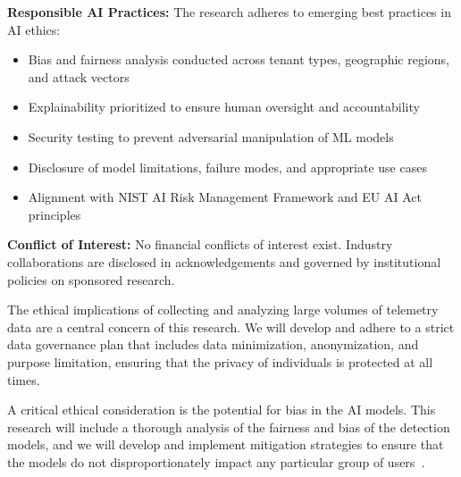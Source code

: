\textbf{Responsible AI Practices:} The research adheres to emerging best practices in AI ethics:
\begin{itemize}
    \item Bias and fairness analysis conducted across tenant types, geographic regions, and attack vectors
    \item Explainability prioritized to ensure human oversight and accountability
    \item Security testing to prevent adversarial manipulation of ML models
    \item Disclosure of model limitations, failure modes, and appropriate use cases
    \item Alignment with NIST AI Risk Management Framework and EU AI Act principles
\end{itemize}

\textbf{Conflict of Interest:} No financial conflicts of interest exist. Industry collaborations are disclosed in acknowledgements and governed by institutional policies on sponsored research.

The ethical implications of collecting and analyzing large volumes of telemetry data are a central concern of this research. We will develop and adhere to a strict data governance plan that includes data minimization, anonymization, and purpose limitation, ensuring that the privacy of individuals is protected at all times.

A critical ethical consideration is the potential for bias in the AI models. This research will include a thorough analysis of the fairness and bias of the detection models, and we will develop and implement mitigation strategies to ensure that the models do not disproportionately impact any particular group of users~\cite{fairness_in_ai_2024}.
